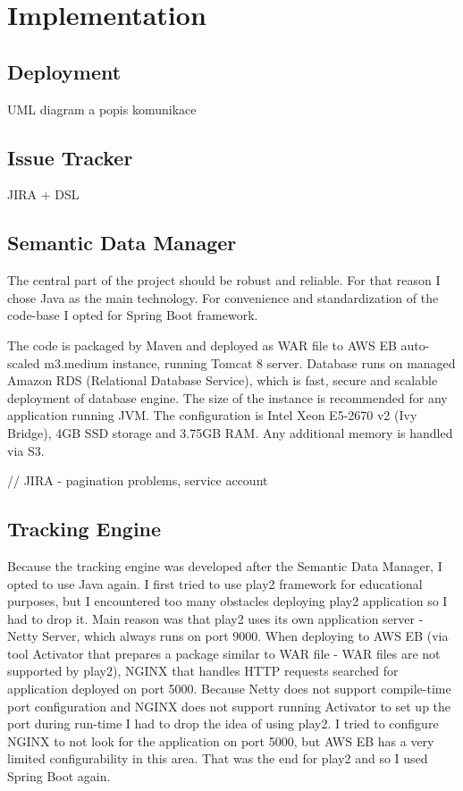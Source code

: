 \chapter{Implementation}

\section{Deployment}
UML diagram a popis komunikace

\section{Issue Tracker}
JIRA + DSL

\section{Semantic Data Manager}
The central part of the project should be robust and reliable. For that reason I chose Java as the main technology. For convenience and standardization of the code-base I opted for Spring Boot framework.

The code is packaged by Maven and deployed as WAR file to AWS EB auto-scaled m3.medium instance, running Tomcat 8 server. Database runs on managed Amazon RDS (Relational Database Service), which is fast, secure and scalable deployment of database engine. The size of the instance is recommended for any application running JVM. The configuration is Intel Xeon E5-2670 v2 (Ivy Bridge), 4GB SSD storage and 3.75GB RAM. Any additional memory is handled via S3.

// JIRA - pagination problems, service account

\section{Tracking Engine}

Because the tracking engine was developed after the Semantic Data Manager, I opted to use Java again. I first tried to use play2 framework for educational purposes, but I encountered too many obstacles deploying play2 application so I had to drop it. Main reason was that play2 uses its own application server - Netty Server, which always runs on port 9000. When deploying to AWS EB (via tool Activator that prepares a package similar to WAR file - WAR files are not supported by play2), NGINX that handles HTTP requests searched for application deployed on port 5000. Because Netty does not support compile-time port configuration and NGINX does not support running Activator to set up the port during run-time I had to drop the idea of using play2. I tried to configure NGINX to not look for the application on port 5000, but AWS EB has a very limited configurability in this area. That was the end for play2 and so I used Spring Boot again.

